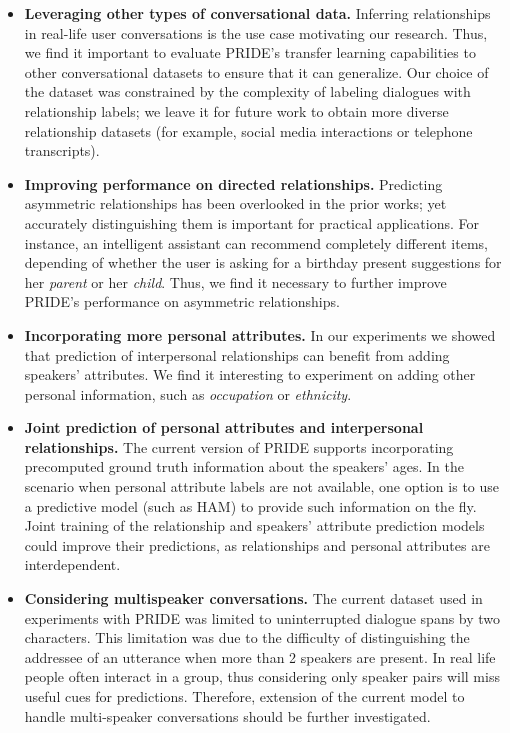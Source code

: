 \begin{itemize}
    \item \textbf{Leveraging other types of conversational data.} Inferring relationships in real-life user conversations is the use case motivating our research. Thus, we find it important to evaluate PRIDE's transfer learning capabilities to other conversational datasets to ensure that it can generalize. Our choice of the dataset was constrained by the complexity of labeling dialogues with relationship labels; we leave it for future work to obtain more diverse relationship datasets (for example, social media interactions or telephone transcripts).
    
    \item \textbf{Improving performance on directed relationships.} Predicting asymmetric relationships has been overlooked in the prior works; yet accurately distinguishing them is important for practical applications. For instance, an intelligent assistant can recommend completely different items, depending of whether the user is asking for a birthday present suggestions for her \textit{parent} or her \textit{child}. Thus, we find it necessary to further improve PRIDE's performance on asymmetric relationships.
    
    \item \textbf{Incorporating more personal attributes.} In our experiments we showed that prediction of interpersonal relationships can benefit from adding speakers' attributes. We find it interesting to experiment on adding other personal information, such as \textit{occupation} or \textit{ethnicity}.

    \item \textbf{Joint prediction of personal attributes and interpersonal relationships.} The current version of PRIDE supports incorporating precomputed ground truth information about the speakers' ages. In the scenario when personal attribute labels are not available, one option is to use a predictive model (such as HAM) to provide such information on the fly. Joint training of the relationship and speakers' attribute prediction models could improve their predictions, as relationships and personal attributes are interdependent.

    \item \textbf{Considering multispeaker conversations.} The current dataset used in experiments with PRIDE was limited to uninterrupted dialogue spans by two characters. This limitation was due to the difficulty of distinguishing the addressee of an utterance when more than 2 speakers are present. In real life people often interact in a group, thus considering only speaker pairs will miss useful cues for predictions. Therefore, extension of the current model to handle multi-speaker conversations should be further investigated.

    
\end{itemize}

